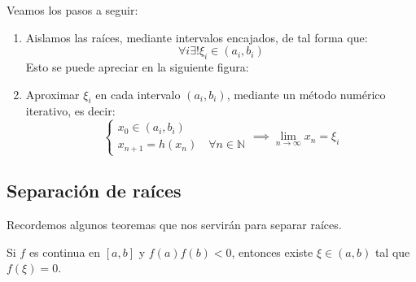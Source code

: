 \begin{teorema}
    Veamos los pasos a seguir:
    \begin{enumerate}
        \item Aislamos las raíces, mediante intervalos encajados, de tal forma que:
        \[
            \forall i \exists ! \xi_i \in (a_i, b_i) 
        \]
        Esto se puede apreciar en la siguiente figura:
        \begin{center}
        \end{center}
        \item Aproximar $\xi_i$ en cada intervalo $(a_i, b_i)$, mediante un método numérico iterativo, es decir:
        \[
            \begin{cases}
                x_0 \in (a_i, b_i) \\
                x_{n+1} = h(x_n) \quad \forall n \in \mathbb{N}
            \end{cases}
            \implies \lim_{n\to\infty} x_n = \xi_i
        \]
    \end{enumerate}
\end{teorema}

\subsection{Separación de raíces}

Recordemos algunos teoremas que nos servirán para separar raíces.

\begin{teorema}
    Si $f$ es continua en $[a,b]$ y $f(a)f(b)<0$, entonces existe $\xi \in (a,b)$ tal que $f(\xi)=0$.
\end{teorema}

